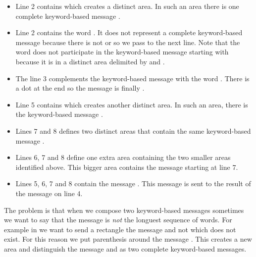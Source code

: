 \documentclass[a4paper,10pt,twoside]{book}
\begin{document}
\begin{itemize}
\item Line 2 contains  which creates a distinct area. In such an area there is one complete keyword-based message . 

\item Line 2 contains the word . It does not represent a complete keyword-based message because there is not  or \ct{;} so we pass to the next line. Note that the word  does not participate in the keyword-based message starting with  because it is in a distinct area delimited by \ct{(} and \ct{)}.

\item The line 3 complements the keyword-based message with  the word . There is a dot at the end so the message is finally . 

\item Line 5 contains  which creates another distinct area. In such an area, there is the keyword-based message . 

\item Lines 7 and 8 defines two distinct areas that contain the same keyword-based message . 

\item Lines 6, 7 and 8 define one extra area  containing the two smaller areas identified above. This bigger area contains the message  starting at line 7.

\item Lines 5, 6, 7 and 8 contain the message . This message is sent to the result of the message  on line 4.
\end{itemize}



The problem is that when we compose two keyword-based messages sometimes we want to say
that the message is \textit{not} the longuest sequence of words. For example in   we want to send a rectangle the message  and not  which does not exist. For this reason we put parenthesis around the message . This creates a new area and distinguish the message  and  as two complete keyword-based messages. 
\end{document}
